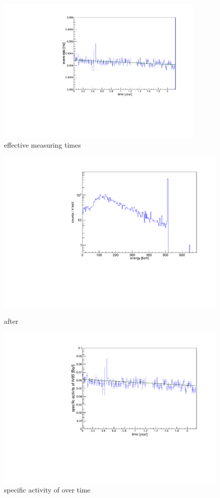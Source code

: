 \begin{figure}[t!]
	\centering
	\ifmakefigures%
	\includegraphics[width=100mm]{./Bilder/eventRateFit.pdf}
	\fi%
	\caption{effective measuring times}
	\label{fig:ChangeInEventRateFit}
\end{figure}%
\begin{figure}[t!]
	\centering
	\begin{minipage}{.5\textwidth}
		\centering
		\includegraphics[width=\textwidth]{./Bilder/Sim1Phasenraum.pdf}
		\caption{after}
		\label{fig:Sim1Spektrum}
	\end{minipage}%
	\begin{minipage}{.5\textwidth}
		\centering
		\includegraphics[width=\textwidth]{./Bilder/Aktivitaet.pdf}
		\caption{specific activity of \Kr over time}
		\label{fig:activity}
	\end{minipage}
\end{figure}
